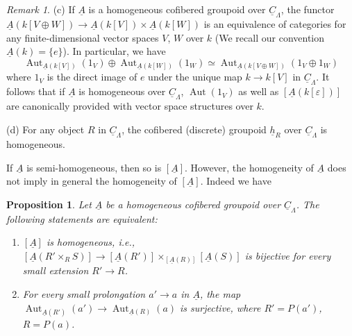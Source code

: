 \documentclass[11pt]{article}
\theoremstyle{plain}
\newtheorem{proposition}[theorem]{Proposition}
\theoremstyle{definition}
\theoremstyle{remark}
\newtheorem{remark}[theorem]{Remark}
\DeclareMathOperator{\Aut}{Aut}
\newcommand{\uA}{\underline{A}}\newcommand{\uH}{\underline{H}}\newcommand{\uExt}{\underline{\operatorname{Ext}}}\newcommand{\uL}{\underline{L}}\newcommand{\uM}{\underline{M}}\newcommand{\uZ}{\underline{Z}}\newcommand{\uB}{\underline{B}}\newcommand{\uC}{\underline{C}}\newcommand{\uD}{\underline{D}}\newcommand{\uE}{\underline{E}}\newcommand{\uG}{\underline{G}}\newcommand{\uP}{\underline{P}}\newcommand{\uQ}{\underline{Q}}
\begin{document}
\begin{remark}
\textup{(c)} If $\uA$ is a homogeneous cofibered groupoid over $\underline{C}_{\Lambda}$, the functor $\uA(k[V \oplus W]) \to \uA(k[V]) \times \uA(k[W])$ is an equivalence of categories for any finite-dimensional vector spaces $V$, $W$ over $k$ (We recall our convention $\uA(k) = \{e\}$). In particular, we have
\[
\Aut_{\uA(k[V])}(1_V) \oplus \Aut_{\uA(k[W])}(1_W) \simeq \Aut_{\uA(k[V \oplus W])}(1_V \oplus 1_W)
\]
where $1_V$ is the direct image of $e$ under the unique map $k \to k[V]$ in $\underline{C}_{\Lambda}$. It follows that if $\uA$ is homogeneous over $\underline{C}_{\Lambda}$, $\Aut(1_V)$ as well as $[\uA(k[\varepsilon])]$ are canonically provided with vector space structures over $k$.

\textup{(d)} For any object $R$ in $\underline{C}_{\Lambda}$, the cofibered (discrete) groupoid $\underline{h}_R$ over $\underline{C}_{\Lambda}$ is homogeneous.

If $\uA$ is semi-homogeneous, then so is $[\uA]$. However, the homogeneity of $\uA$ does not imply in general the homogeneity of $[\uA]$. Indeed we have
\end{remark}

\begin{proposition}
Let $\uA$ be a homogeneous cofibered groupoid over $\underline{C}_{\Lambda}$. The following statements are equivalent:
\begin{enumerate}
\item[(i)] $[\uA]$ is homogeneous, i.e., $[\uA(R' \times_R S)] \to [\uA(R')] \times_{[\uA(R)]} [\uA(S)]$ is bijective for every small extension $R' \to R$.
\item[(ii)] For every small prolongation $a' \to a$ in $\uA$, the map $\Aut_{\uA(R')}(a') \to \Aut_{\uA(R)}(a)$ is surjective, where $R' = P(a')$, $R = P(a)$.
\end{enumerate}
\end{proposition}
\end{document}
